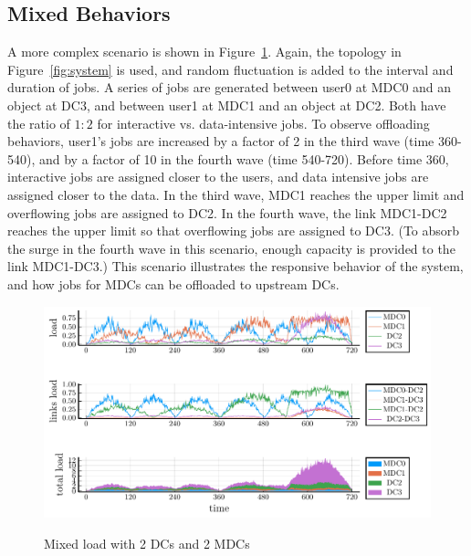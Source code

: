 \subsection{Mixed Behaviors}

A more complex scenario is shown in Figure~\ref{fig:mixed}.
Again, the topology in Figure~\ref{fig:system} is used, and
random fluctuation is added to the interval and duration of jobs.
A series of jobs are generated
between user0 at MDC0 and an object at DC3, and
between user1 at MDC1 and an object at DC2.
Both have the ratio of $1:2$ for interactive vs. data-intensive jobs.
To observe offloading behaviors, user1's jobs are increased by a
factor of 2 in the third wave (time 360-540), and by a factor of 10 in
the fourth wave (time 540-720). 
Before time 360, interactive jobs are assigned closer to the users,
and data intensive jobs are assigned closer to the data.
In the third wave, MDC1 reaches the upper limit and overflowing jobs are
assigned to DC2.
In the fourth wave, the link MDC1-DC2 reaches the upper limit so that
overflowing jobs are assigned to DC3.
(To absorb the surge in the fourth wave in this scenario, enough
capacity is provided to the link MDC1-DC3.)
This scenario illustrates the responsive behavior of the system,
and how jobs for MDCs can be offloaded to upstream DCs.

\begin{figure}[tb]
  \begin{center}
    \includegraphics[width=1.0\columnwidth]{simu2.pdf}
    \vspace{-2.0ex}
    \caption{Mixed load with 2 DCs and 2 MDCs}
    \label{fig:mixed}
  \end{center}
\end{figure}


